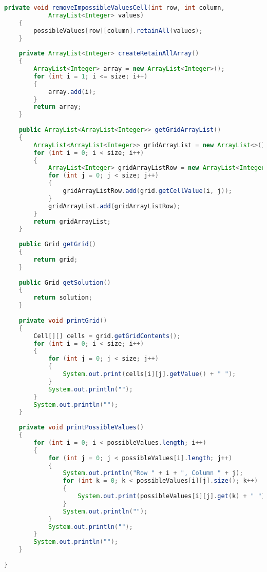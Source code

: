 \begin{lstlisting}[language=Java,basicstyle=\tiny,caption=SolverRuleBased.java]
    private void removeImpossibleValuesCell(int row, int column, 
            ArrayList<Integer> values)
    {
        possibleValues[row][column].retainAll(values);
    }
    
    private ArrayList<Integer> createRetainAllArray()
    {
        ArrayList<Integer> array = new ArrayList<Integer>();
        for (int i = 1; i <= size; i++)
        {
            array.add(i);
        }
        return array;
    }
    
    public ArrayList<ArrayList<Integer>> getGridArrayList()
    {
        ArrayList<ArrayList<Integer>> gridArrayList = new ArrayList<>();
        for (int i = 0; i < size; i++)
        {
            ArrayList<Integer> gridArrayListRow = new ArrayList<Integer>();
            for (int j = 0; j < size; j++)
            {
                gridArrayListRow.add(grid.getCellValue(i, j));
            }
            gridArrayList.add(gridArrayListRow);
        }
        return gridArrayList;
    }
    
    public Grid getGrid()
    {
        return grid;
    }
    
    public Grid getSolution()
    {
        return solution;
    }
    
    private void printGrid()
    {
        Cell[][] cells = grid.getGridContents();
        for (int i = 0; i < size; i++)
        {
            for (int j = 0; j < size; j++)
            {
                System.out.print(cells[i][j].getValue() + " ");
            }
            System.out.println("");
        }
        System.out.println("");
    }
    
    private void printPossibleValues()
    {
        for (int i = 0; i < possibleValues.length; i++)
        {
            for (int j = 0; j < possibleValues[i].length; j++)
            {
                System.out.println("Row " + i + ", Column " + j);
                for (int k = 0; k < possibleValues[i][j].size(); k++)
                {
                    System.out.print(possibleValues[i][j].get(k) + " ");
                }
                System.out.println("");
            }
            System.out.println("");
        }
        System.out.println("");
    }
    
}
\end{lstlisting}

